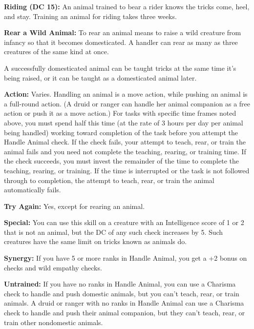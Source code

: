 \textbf{Riding (DC 15):} An animal trained to bear a rider knows the tricks come, heel, and stay. Training an animal for riding takes three weeks.

\vspace{12pt}
\textbf{Rear a Wild Animal:} To rear an animal means to raise a wild creature from infancy so that it becomes domesticated. A handler can rear as many as three creatures of the same kind at once.

A successfully domesticated animal can be taught tricks at the same time it's being raised, or it can be taught as a domesticated animal later.

\textbf{Action:} Varies. Handling an animal is a move action, while pushing an animal is a full-round action. (A druid or ranger can handle her animal companion as a free action or push it as a move action.) For tasks with specific time frames noted above, you must spend half this time (at the rate of 3 hours per day per animal being handled) working toward completion of the task before you attempt the Handle Animal check. If the check fails, your attempt to teach, rear, or train 
the animal fails and you need not complete the teaching, rearing, or training time. If the check succeeds, you must invest the remainder of the time to complete the teaching, rearing, or training. If the time is interrupted or the task is not followed through to completion, the attempt to teach, rear, or train the animal automatically fails.

\textbf{Try Again:} Yes, except for rearing an animal.

\textbf{Special:} You can use this skill on a creature with an Intelligence score of 1 or 2 that is not an animal, but the DC of any such check increases by 5. Such creatures have the same limit on tricks known as animals do.

\textbf{Synergy:} If you have 5 or more ranks in Handle Animal, you get a +2 bonus on  checks and wild empathy checks.

\textbf{Untrained:} If you have no ranks in Handle Animal, you can use a Charisma check to handle and push domestic animals, but you can't teach, rear, or train animals. A druid or ranger with no ranks in Handle Animal can use a Charisma check to handle and push their animal companion, but they can't teach, rear, or train other nondomestic animals.

